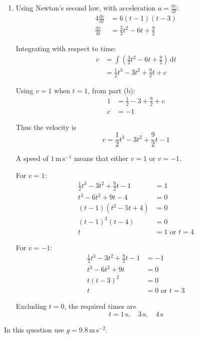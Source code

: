 \documentclass[leqno]{article}
\begin{document}
\begin{enumerate}[
  label=\textbf{\arabic*.},
  leftmargin=*,
  topsep=0pt,
  partopsep=0pt,
  parsep=0pt
]
\begin{djsSolution}
\begin{enumerate}[label=\textbf{(\alph*)}, start=1]
\item Using Newton's second law, with acceleration \(a=\frac{\mathrm{d}v}{\mathrm{d}t}\):
\begin{align*}
4\frac{\mathrm{d}v}{\mathrm{d}t}&=6(t-1)(t-3)\\
\frac{\mathrm{d}v}{\mathrm{d}t}&=\frac32t^2-6t+\frac92
\end{align*}

Integrating with respect to time:
\begin{align*}
v&=\int\left(\frac32t^2-6t+\frac92\right)\,\mathrm{d}t\\
&=\frac12t^3-3t^2+\frac92t+c
\end{align*}

Using \(v=1\) when \(t=1\), from part (b):
\begin{align*}
1&=\frac12-3+\frac92+c\\
c&=-1
\end{align*}

Thus the velocity is
\[
v=\frac12t^3-3t^2+\frac92t-1
\]

A speed of \(1\,\mathrm{m\,s^{-1}}\) means that either \(v=1\) or \(v=-1\).

For \(v=1\):
\begin{align*}
\frac12t^3-3t^2+\frac92t-1&=1\\
t^3-6t^2+9t-4&=0\\
(t-1)(t^2-5t+4)&=0\\
(t-1)^2(t-4)&=0\\
t&=1\text{ or }t=4
\end{align*}

For \(v=-1\):
\begin{align*}
\frac12t^3-3t^2+\frac92t-1&=-1\\
t^3-6t^2+9t&=0\\
t(t-3)^2&=0\\
t&=0\text{ or }t=3
\end{align*}

Excluding \(t=0\), the required times are
\[
t=1\,\mathrm{s},\quad 3\,\mathrm{s},\quad 4\,\mathrm{s}
\]

\end{enumerate}
\end{djsSolution}

\newpage

\questionitem

In this question use $g=9.8\,\mathrm{m\,s^{-2}}$. \\


\end{enumerate}
\end{document}
